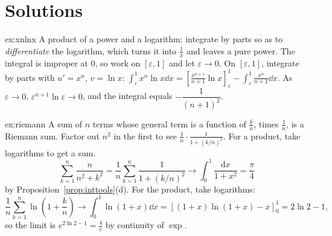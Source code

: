 \section{Solutions}
\begin{solution}{ex:xnlnx}
\idea A product of a power and a logarithm: integrate by parts so as to \emph{differentiate} the logarithm, which turns it into $\frac1x$ and leaves a pure power. The integral is improper at $0$, so work on $[\varepsilon,1]$ and let $\varepsilon\to0$.
\writeup On $[\varepsilon,1]$, integrate by parts with $u'=x^n$, $v=\ln x$:
$\int_\varepsilon^1x^n\ln x\dd x=\left[\frac{x^{n+1}}{n+1}\ln x\right]_\varepsilon^1-\int_\varepsilon^1\frac{x^n}{n+1}\dd x$.
As $\varepsilon\to0$, $\varepsilon^{n+1}\ln\varepsilon\to0$, and the integral equals $-\dfrac1{(n+1)^2}$.
\end{solution}

\begin{solution}{ex:riemann}
\idea A sum of $n$ terms whose general term is a function of $\frac kn$, times $\frac1n$, is a Riemann sum. Factor out $n^2$ in the first to see $\frac1n\cdot\frac1{1+(k/n)^2}$. For a product, take logarithms to get a sum.
\writeup
\[
\sum_{k=1}^n\frac n{n^2+k^2}=\frac1n\sum_{k=1}^n\frac1{1+(k/n)^2}\to\int_0^1\frac{\mathrm dx}{1+x^2}=\frac\pi4
\]
 by Proposition~\ref{prop:inttools}(d).
For the product, take logarithms:
\[
\frac1n\sum_{k=1}^n\ln\left(1+\frac kn\right)\to\int_0^1\ln(1+x)\dd x=\left[(1+x)\ln(1+x)-x\right]_0^1=2\ln2-1,
\]
so the limit is $e^{2\ln2-1}=\frac4e$ by continuity of $\exp$.
\end{solution}


